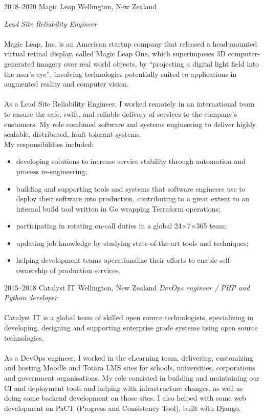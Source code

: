\documentclass[]{friggeri-cv}
\begin{document}
\begin{entrylist}

  \entry
    {2018--2020}
    {Magic Leap}
    {Wellington, New Zealand}
    {
      \textit{Lead Site Reliability Engineer} \\
      \\
      Magic Leap, Inc. is an American startup company that released a
      head-mounted virtual retinal display, called Magic Leap One, which
      superimposes 3D computer-generated imagery over real world objects, by
      ``projecting a digital light field into the user's eye'', involving
      technologies potentially suited to applications in augmented reality and
      computer vision. \\
      \\
      As a Lead Site Reliability Engineer, I worked remotely in an
      international team to ensure the safe, swift, and reliable delivery of
      services to the company's customers. My role combined software and
      systems engineering to deliver highly scalable, distributed, fault
      tolerant systems.
      \\
      My responsibilities included:
      \begin{itemize}
        \item developing solutions to increase service stability through
              automation and process re-engineering;
        \item building and supporting tools and systems that software engineers
              use to deploy their software into production,
              contributing to a great extent to an internal build tool written
              in Go wrapping Terraform operations;
        \item participating in rotating on-call duties in a global
              24$\times$7$\times$365 team;
        \item updating job knowledge by studying state-of-the-art tools and
              techniques;
        \item helping development teams operationalize their efforts to enable
              self-ownership of production services.
      \end{itemize}
    }

  \entry
    {2015--2018}
    {Catalyst IT}
    {Wellington, New Zealand}
    {
      \textit{DevOps engineer / PHP and Python developer} \\
      \\
      Catalyst IT is a global team of skilled open source technologists,
      specializing in developing, designing and supporting enterprise grade
      systems using open source technologies. \\
      \\
      As a DevOps engineer, I worked in the eLearning team, delivering,
      customizing and hosting Moodle and Totara LMS sites for schools,
      universities, corporations and government organisations. My role
      consisted in building and maintaining our CI and deployment tools and
      helping with infrastructure changes, as well as doing some backend
      development on those sites. I also helped with some web development on
      PaCT (Progress and Consistency Tool), built with Django.
    }


\end{entrylist}
\end{document}
